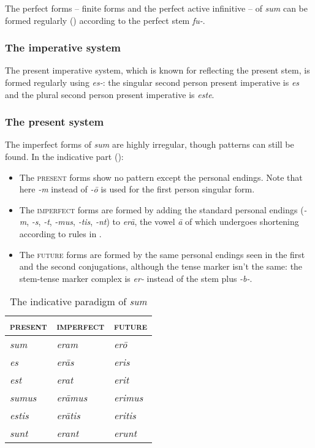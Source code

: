 \documentclass[a4paper, oneside, 12pt]{report}
\newcommand{\form}[1]{\emph{#1}}
\newcommand*{\category}[1]{\textsc{#1}}
\begin{document}
The perfect forms -- finite forms and the perfect active infinitive -- 
of \form{sum} can be formed regularly ()
according to the perfect stem \form{fu-}.

\subsubsection{The imperative system}

The present imperative system, 
which is known for reflecting the present stem,
is formed regularly using \form{es-}:
the singular second person present imperative is \form{es}
and the plural second person present imperative is \form{este}.

\subsubsection{The present system}

The imperfect forms of \form{sum} are highly irregular,
though patterns can still be found.
In the indicative part (): 
\begin{itemize}
    \item The \category{present} forms show no pattern
    except the personal endings.
    Note that here \form{-m} instead of \form{-\={o}}
    is used for the first person singular form.
    \item The \category{imperfect} forms are formed 
    by adding the standard personal endings 
    (\form{-m}, \form{-s}, \form{-t}, 
    \form{-mus}, \form{-tis}, \form{-nt})
    to \form{er\={a}},
    the vowel \form{\={a}} of which 
    undergoes shortening according to rules in .
    \item The \category{future} forms are formed by 
    the same personal endings seen in the first and the second conjugations,
    although the tense marker isn't the same: 
    the stem-tense marker complex is \form{er-}
    instead of the stem plus \form{-b-}.
\end{itemize}

\begin{table}[H]
    \caption{The indicative paradigm of \form{sum}}
    \label{tbl:indicative-sum}
    \centering
    \begin{tabular}{lll}
    \toprule
    \category{present} & \category{imperfect}  & \category{future}  \\
    \midrule
    \form{sum}     & \form{eram}       & \form{er\={o}} \\
    \form{es}      & \form{er\={a}s}   & \form{eris}    \\
    \form{est}     & \form{erat}       & \form{erit}    \\
    \form{sumus}   & \form{er\={a}mus} & \form{erimus}  \\
    \form{estis}   & \form{er\={a}tis} & \form{eritis}  \\
    \form{sunt}    & \form{erant}      & \form{erunt}   \\ \bottomrule
    \end{tabular}
\end{table}
\end{document}
